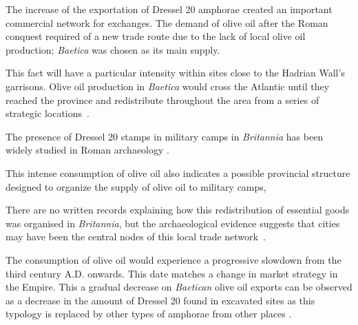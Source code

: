 \documentclass[review]{elsarticle}
\newcommand{\memo}[2]{\textcolor{#1}{#2}}
\newcommand{\xavi}[1]{\memo{magenta}{XRC: #1\\}}
\begin{document}
The increase of the exportation of Dressel 20 amphorae created an important commercial network for exchanges. The demand of olive oil after the Roman conquest required of a new trade route due to the lack of local olive oil production; \textit{Baetica} was chosen as its main supply.


This fact will have a particular intensity within sites close to the Hadrian Wall's garrisons. Olive oil production in \textit{Baetica} would cross the Atlantic until they reached the province and redistribute throughout the area from a series of strategic locations~\citep{carreras_atlantic_2012}. 


The presence of Dressel 20 stamps in military camps in \textit{Britannia} has been widely studied in Roman archaeology \citep{williams_importation_1983,
funari_corpus_1996,
carreras_britannia_1998,carreras_abastecimiento_2003}.%


This intense consumption of olive oil also indicates a possible provincial structure designed to organize the supply of olive oil to military camps, 


There are no written records explaining how this redistribution of essential goods was organised in \textit{Britannia}, but the archaeological evidence suggests that cities may have been the central nodes of this local trade network~\citep[45]{funari_economic_2005}.

The consumption of olive oil would experience a progressive slowdown from the third century A.D. onwards. This date matches a change in market strategy in the Empire. This a gradual decrease on \textit{Baetican} olive oil exports can be observed as a decrease in the amount of Dressel 20 found in excavated sites as this typology is replaced by other types of amphorae from other places \citep{rodriguez1991aceite,millet_anforas_1998}.
\end{document}
